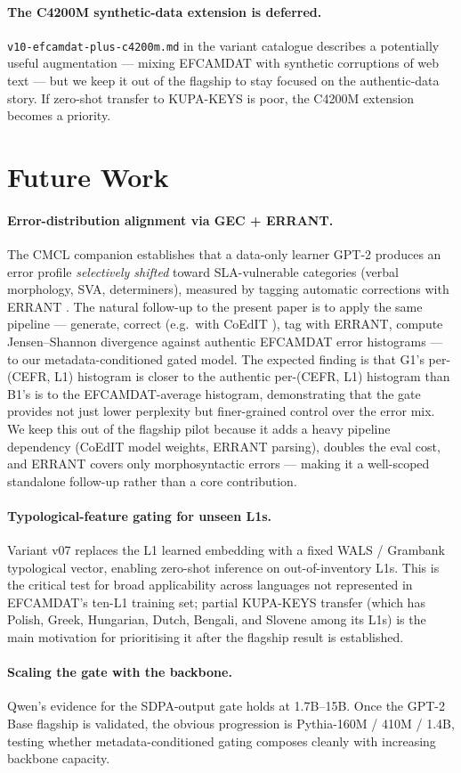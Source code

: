 \paragraph{The C4200M synthetic-data extension is deferred.}
\texttt{v10-efcamdat-plus-c4200m.md} in the variant catalogue describes
a potentially useful augmentation --- mixing EFCAMDAT with synthetic
corruptions of web text --- but we keep it out of the flagship to stay
focused on the authentic-data story. If zero-shot transfer to
KUPA-KEYS is poor, the C4200M extension becomes a priority.

\section*{Future Work}
\label{sec:future-work}

\paragraph{Error-distribution alignment via GEC + ERRANT.}
The CMCL companion establishes that a data-only learner GPT-2 produces
an error profile \emph{selectively shifted} toward SLA-vulnerable
categories (verbal morphology, SVA, determiners), measured by tagging
automatic corrections with ERRANT
\citep{bryant2019errant}. The natural follow-up to the present
paper is to apply the same pipeline --- generate, correct (e.g.\ with
CoEdIT \citep{raheja2023coedit}), tag with ERRANT, compute
Jensen--Shannon divergence against authentic EFCAMDAT error histograms
--- to our metadata-conditioned gated model. The expected finding is
that G1's per-(CEFR, L1) histogram is closer to the authentic
per-(CEFR, L1) histogram than B1's is to the EFCAMDAT-average
histogram, demonstrating that the gate provides not just lower
perplexity but finer-grained control over the error mix. We keep this
out of the flagship pilot because it adds a heavy pipeline dependency
(CoEdIT model weights, ERRANT parsing), doubles the eval cost, and
ERRANT covers only morphosyntactic errors --- making it a well-scoped
standalone follow-up rather than a core contribution.

\paragraph{Typological-feature gating for unseen L1s.}
Variant v07 replaces the L1 learned embedding with a fixed WALS /
Grambank typological vector, enabling zero-shot inference on
out-of-inventory L1s. This is the critical test for broad applicability
across languages not represented in EFCAMDAT's ten-L1 training set;
partial KUPA-KEYS transfer (which has Polish, Greek, Hungarian, Dutch,
Bengali, and Slovene among its L1s) is the main motivation for
prioritising it after the flagship result is established.

\paragraph{Scaling the gate with the backbone.}
Qwen's evidence for the SDPA-output gate holds at 1.7B--15B. Once the
GPT-2 Base flagship is validated, the obvious progression is Pythia-160M
/ 410M / 1.4B, testing whether metadata-conditioned gating composes
cleanly with increasing backbone capacity.
